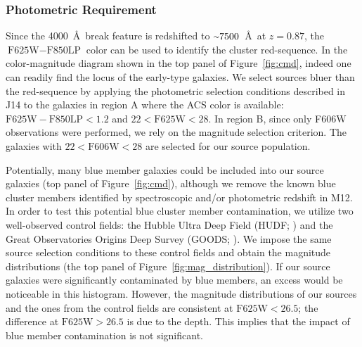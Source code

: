 \documentclass[twocolumn]{aastex631}
\newcommand{\mytilde}{\raise.19ex\hbox{$\scriptstyle\sim$}}
\begin{document}
\subsubsection{Photometric Requirement} \label{selection_photo}
Since the 4000~\AA~break feature is redshifted to $\mytilde7500$~\AA~at $z=0.87$, the $\mbox{F625W}-\mbox{F850LP}$ color can be used to identify the cluster red-sequence. 
In the color-magnitude diagram shown in the top panel of Figure~\ref{fig:cmd}, indeed one can readily find the locus of the early-type galaxies. 
We select sources bluer than the red-sequence by applying the photometric selection conditions described in J14 to the galaxies in region A where the ACS color is available: $\mbox{F625W}-\mbox{F850LP}< 1.2$ and $22 < \mbox{F625W} < 28$. 
In region B, since only F606W observations were performed, we rely on the magnitude selection criterion. The galaxies with $22 < \mbox{F606W} < 28$ are selected for our source population. 


Potentially, many blue member galaxies could be included into our source galaxies (top panel of Figure~\ref{fig:cmd}), although we remove the known blue cluster members identified by spectroscopic and/or photometric redshift in M12. 
In order to test this potential blue cluster member contamination, we utilize two well-observed control fields: the Hubble Ultra Deep Field (HUDF; \citealt{UVUDF}) and the Great Observatories Origins Deep Survey (GOODS; \citealt{GOODSmag}). 
We impose the same source selection conditions to these control fields and obtain the magnitude distributions (the top panel of Figure~\ref{fig:mag_distribution}). 
If our source galaxies were significantly contaminated by blue members, an excess would be noticeable in this histogram. However, the magnitude distributions of our sources and the ones from the control fields are consistent at $\mbox{F625W} < 26.5$; the difference at $\mbox{F625W} > 26.5$ is due to the depth. 
This implies that the impact of blue member contamination is not significant. 
\end{document}
